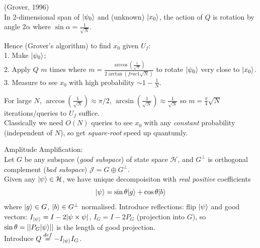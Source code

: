 \documentclass[a4paper]{article}
\begin{document}
\begin{thm} (Grover, 1996)\\
    In 2-dimensional span of $|\psi_0\rangle$ and (unknown) $|x_0\rangle$, the action of $Q$ is rotation by angle $2\alpha$ where $\sin\alpha = \frac{1}{\sqrt{N}}$.\\
\end{thm}

Hence (Grover's algorithm) to find $x_0$ given $U_f$:\\
1. Make $|\psi_0\rangle$;\\
2. Apply $Q$ $m$ times where $m = \frac{\arccos(\frac{1}{\sqrt{N}})}{2\arctan(frac{1}{\sqrt{N}})}$ to rotate $|\psi_0\rangle$ very close to $|x_0\rangle$.\\
3. Measure to see $x_0$ with high probability $\sim 1-\frac{1}{N}$.

For large $N$, $\arccos(\frac{1}{\sqrt{N}}) \approx \pi/2$, $\arcsin(\frac{1}{\sqrt{N}}) \approx \frac{1}{\sqrt{N}}$ so $m = \frac{\pi}{4} \sqrt{N}$ iterations/queries to $U_f$ suffice.\\
Classically we need $O(N)$ queries to see $x_0$ with any \emph{constant} probability (independent of $N$), so get \emph{square-root} speed up quantumly.

Amplitude Amplification:\\
Let $G$ be any subspace (\emph{good subspace}) of state space $\mathcal{H}$, and $G^\perp$ is orthogonal complement (\emph{bad subspace}) $\mathcal{J} = G \oplus G^\perp$.\\
Given any $|\psi \rangle \in \mathcal{H}$, we have unique decompoisiton with \emph{real positive} coefficients
$$|\psi\rangle = \sin\theta |g\rangle + \cos\theta |b\rangle$$
where $|g\rangle \in G$, $|b\rangle \in G^\perp$ normalised. Introduce reflections: flip $|\psi\rangle $ and good vectors: $I_{|\psi\rangle} = I-2|\psi \times \psi|$, $I_G = I-2P_G$ (projection into $G$), so $\sin\theta = ||P_G |\psi\rangle||$ is the length of good projection.\\
Introduce $Q \stackrel{def}{=} -I_{|\psi\rangle} I_G$.
\end{document}
